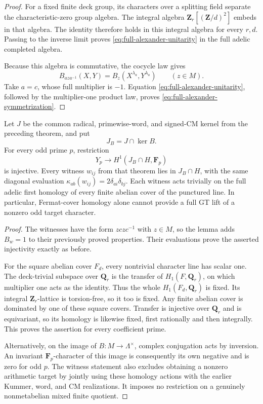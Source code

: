 \begin{proof}
For a fixed finite deck group, its characters over a splitting
field separate the characteristic-zero group algebra.
The integral algebra \(\mathbf Z_r[(\mathbf Z/d)^2]\)
embeds in that algebra.  The identity therefore holds in
this integral algebra for every \(r,d\).  Passing to the
inverse limit proves \eqref{eq:full-alexander-unitarity}
in the full adelic completed algebra.

Because this algebra is commutative, the cocycle law gives
\[
 B_{a z a^{-1}}(X,Y)=B_z(X^{\lambda_a},Y^{\lambda_a})
                                            \qquad(z\in M).
\]
Take \(a=c\), whose full multiplier is \(-1\).
Equation \eqref{eq:full-alexander-unitarity}, followed by
the multiplier-one product law, proves
\eqref{eq:full-alexander-symmetrization}.
\end{proof}

\begin{corollary}\label{cor:odd-target-invisible-abelian-covers}
Let \(J\) be the common radical, primewise-word, and signed-CM
kernel from the preceding theorem, and put
\[
                              J_B=J\cap\ker B.
\]
For every odd prime \(p\), restriction
\[
                  Y_p\longrightarrow H^1(J_B\cap H,\mathbf F_p)
\]
is injective.  Every witness \(w_{ij}\) from that theorem
lies in \(J_B\cap H\), with the same diagonal evaluation
\(\kappa_{ab}(w_{ij})=2\delta_{ai}\delta_{bj}\).
Each witness acts trivially on the full adelic first
homology of every finite abelian cover of the punctured line.
In particular, Fermat-cover homology alone cannot provide
a full GT lift of a nonzero odd target character.
\end{corollary}

\begin{proof}
The witnesses have the form \(z c z c^{-1}\) with \(z\in M\),
so the lemma adds \(B_w=1\) to their previously proved
properties.  Their evaluations prove the asserted
injectivity exactly as before.

For the square abelian cover \(F_d\), every nontrivial
character line has scalar one.  The deck-trivial subspace
over \(\mathbf Q_r\) is the transfer of \(H_1(F,\mathbf Q_r)\),
on which multiplier one acts as the identity.  Thus the
whole \(H_1(F_d,\mathbf Q_r)\) is fixed.  Its integral
\(\mathbf Z_r\)-lattice is torsion-free, so it too is fixed.
Any finite abelian cover is dominated by one of these
square covers.  Transfer is injective over \(\mathbf Q_r\)
and is equivariant, so its homology is likewise fixed,
first rationally and then integrally.  This proves the
assertion for every coefficient prime.

Alternatively, on the image of \(B:M\to\Lambda^\times\),
complex conjugation acts by inversion.  An invariant
\(\mathbf F_p\)-character of this image is consequently
its own negative and is zero for odd \(p\).
The witness statement also excludes obtaining a nonzero
arithmetic target by jointly using these homology actions
with the earlier Kummer, word, and CM realizations.
It imposes no restriction on a genuinely nonmetabelian
mixed finite quotient.
\end{proof}
